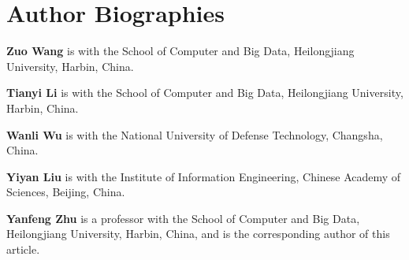 \documentclass[journal]{IEEEtran}
\begin{document}
\section*{Author Biographies}
\begingroup\footnotesize
\setlength{\parskip}{0.5\baselineskip}
\noindent\textbf{Zuo Wang} is with the School of Computer and Big Data, Heilongjiang University, Harbin, China.\par
\noindent\textbf{Tianyi Li} is with the School of Computer and Big Data, Heilongjiang University, Harbin, China.\par
\noindent\textbf{Wanli Wu} is with the National University of Defense Technology, Changsha, China.\par
\noindent\textbf{Yiyan Liu} is with the Institute of Information Engineering, Chinese Academy of Sciences, Beijing, China.\par
\noindent\textbf{Yanfeng Zhu} is a professor with the School of Computer and Big Data, Heilongjiang University, Harbin, China, and is the corresponding author of this article.\par
\endgroup
\end{document}
